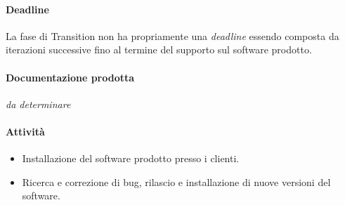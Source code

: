 \paragraph{Deadline}
La fase di Transition non ha propriamente una \emph{deadline} essendo composta da iterazioni successive fino al termine del supporto sul software prodotto.

\paragraph{Documentazione prodotta}
\emph{da determinare}

\paragraph{Attivit\`a}
\begin{itemize}
	\item Installazione del software prodotto presso i clienti.
	\item Ricerca e correzione di bug, rilascio e installazione di nuove versioni del software.
\end{itemize}
